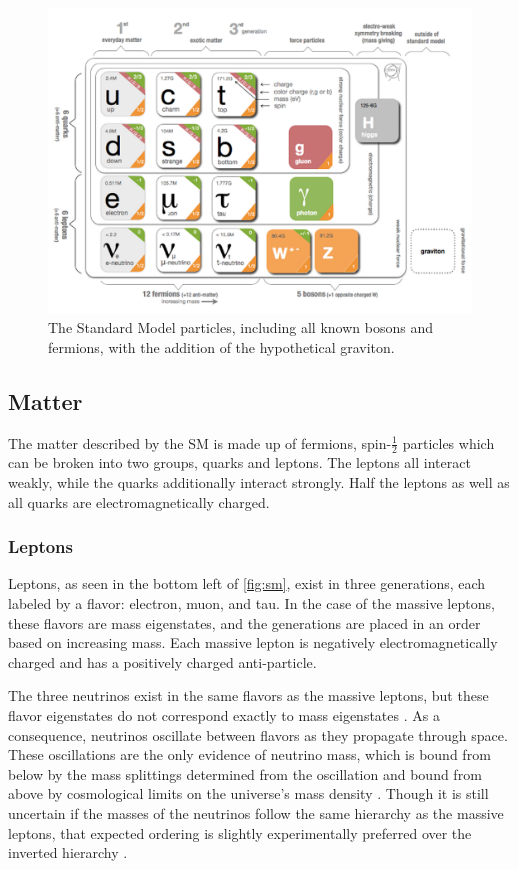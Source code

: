 \begin{centering}
\begin{figure}[bth]
\myfloatalign
\includegraphics[width=.85\linewidth]{figures/theory/standardmodel.png}
\caption{The Standard Model particles, including all known bosons and fermions, with the addition of the hypothetical graviton. \cite{Galbraith:2012}}
\label{fig:sm}
\end{figure}
\end{centering}

\subsection{Matter}
\label{sec:matter}

The matter described by the \ac{SM} is made up of fermions, spin-$\frac{1}{2}$ particles which can be broken into two groups, quarks and leptons. The leptons all interact weakly, while the quarks additionally interact strongly. Half the leptons as well as all quarks are electromagnetically charged. 

\subsubsection{Leptons}

Leptons, as seen in the bottom left of \autoref{fig:sm}, exist in three generations, each labeled by a flavor: electron, muon, and tau. In the case of the massive leptons, these flavors are mass eigenstates, and the generations are placed in an order based on increasing mass. Each massive lepton is negatively electromagnetically charged and has a positively charged anti-particle. 

The three neutrinos exist in the same flavors as the massive leptons, but these flavor eigenstates do not correspond exactly to mass eigenstates \cite{Griffiths:111880}. As a consequence, neutrinos oscillate between flavors as they propagate through space. These oscillations are the only evidence of neutrino mass, which is bound from below by the mass splittings determined from the oscillation and bound from above by cosmological limits on the universe's mass density \cite{1979PhLB...87..144H}. Though it is still uncertain if the masses of the neutrinos follow the same hierarchy as the massive leptons, that expected ordering is slightly experimentally preferred over the inverted hierarchy \cite{Huang:2016}. 

